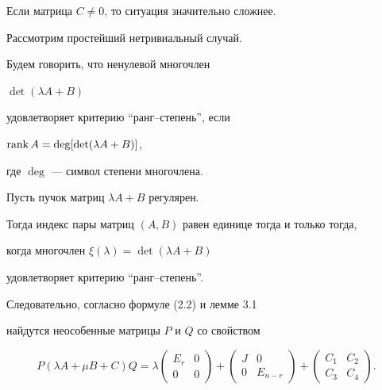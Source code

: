 Если матрица $C\neq 0$, то ситуация значительно сложнее.


Рассмотрим простейший нетривиальный случай.





\begin{defns}


Будем говорить, что ненулевой многочлен


$\det (\lambda A+B)$


удовлетворяет критерию ``ранг--степень'', если


$\operatorname{rank} A=\deg [\det (\lambda A+B)]$,


где $\deg$ --- символ степени многочлена.


\end{defns}





\begin{lems}


Пусть пучок матриц $\lambda A+B$ регулярен.


Тогда индекс пары матриц $(A,B)$ равен единице тогда и только тогда,


когда многочлен $\xi (\lambda )=\det (\lambda A+B)$


удовлетворяет критерию ``ранг--степень''.


\end{lems}





Следовательно, согласно формуле (2.2) и лемме 3.1


найдутся неособенные матрицы $P$ и $Q$ со свойством


\begin{equation}


P(\lambda A+\mu B +C)Q=\lambda


\begin{pmatrix} E_r & 0\\ 0 & 0\end{pmatrix}+


\begin{pmatrix}J&0\\ 0&E_{n-r}\end{pmatrix}+


\begin{pmatrix} C_1 & C_2 \\ C_3 & C_4 \end{pmatrix}.


\end{equation}





